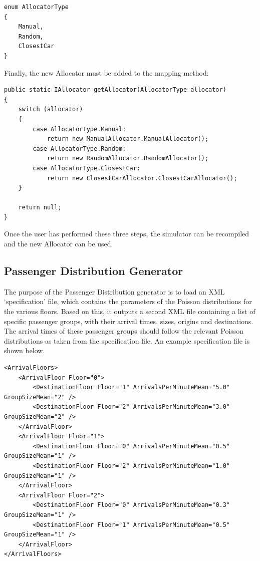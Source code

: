 \documentclass{UoYCSproject}
\begin{document}
\begin{lstlisting}
enum AllocatorType
{
	Manual,
	Random,
	ClosestCar
}
\end{lstlisting}

Finally, the new Allocator must be added to the mapping method:

\begin{lstlisting}
public static IAllocator getAllocator(AllocatorType allocator)
{
	switch (allocator)
	{
		case AllocatorType.Manual:
			return new ManualAllocator.ManualAllocator();
		case AllocatorType.Random:
			return new RandomAllocator.RandomAllocator();
		case AllocatorType.ClosestCar:
			return new ClosestCarAllocator.ClosestCarAllocator();
	}
	
	return null;
}
\end{lstlisting}

Once the user has performed these three steps, the simulator can be recompiled and the new Allocator can be used.

\subsection{Passenger Distribution Generator}

The purpose of the Passenger Distribution generator is to load an XML `specification' file, which contains the parameters of the Poisson distributions for the various floors.  Based on this, it outputs a second XML file containing a list of specific passenger groups, with their arrival times, sizes, origins and destinations.  The arrival times of these passenger groups should follow the relevant Poisson distributions as taken from the specification file.  An example specification file is shown below.

\lstset{language=XML}
\begin{lstlisting}
<ArrivalFloors>
	<ArrivalFloor Floor="0">
		<DestinationFloor Floor="1" ArrivalsPerMinuteMean="5.0" GroupSizeMean="2" />
		<DestinationFloor Floor="2" ArrivalsPerMinuteMean="3.0" GroupSizeMean="2" />
	</ArrivalFloor>
	<ArrivalFloor Floor="1">
		<DestinationFloor Floor="0" ArrivalsPerMinuteMean="0.5" GroupSizeMean="1" />
		<DestinationFloor Floor="2" ArrivalsPerMinuteMean="1.0" GroupSizeMean="1" />
	</ArrivalFloor>
	<ArrivalFloor Floor="2">
		<DestinationFloor Floor="0" ArrivalsPerMinuteMean="0.3" GroupSizeMean="1" />
		<DestinationFloor Floor="1" ArrivalsPerMinuteMean="0.5" GroupSizeMean="1" />
	</ArrivalFloor>
</ArrivalFloors>
\end{lstlisting}
\end{document}
